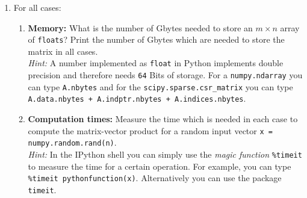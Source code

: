\begin{enumerate}
$$\begin{pmatrix}
-1 & 2 		& -1  &\ddots &  \vdots\\
0 & \ddots  		&\ddots   	 &\ddots  & 0 \\
\vdots    & \ddots  		&-1  	 &2 & -1\\
0 & \cdots 	&  0  &-1 & 2\\
\end{pmatrix} \in \mathbb{R}^{n \times n}$$
and the input vector $$x = (1,\cdots,1)^\top \in \mathbb{R}^n ~~~(\text{you can use:}~~ \verb|x = numpy.ones(n)|).$$ 
\begin{enumerate}
	\item Determine how $b:=A\cdot x \in \mathbb{R}^n$ looks like in this example in order to facilitate a test.
	\item Test whether your four routines compute the matrix--vector product correctly by checking $A\cdot x = b $.
	\item Use different values for the dimension $n$ (especially large $n\geq 10^5$ -- note that you may exceed your hardware capacities for the dense computations).
\end{enumerate}
\textit{Remark:} The matrix has ``$2$'' on the main diagonal and ``$-1$'' on the first off-diagonals.

\item For all cases:
\begin{enumerate}
	\item \textbf{Memory:} What is the number of Gbytes needed to store an $m \times n$ array of \texttt{floats}? Print the number of Gbytes which are needed to store the matrix in all cases.  \\
	\textit{Hint:} A number implemented as \texttt{float} in Python implements double precision and therefore needs \texttt{64} Bits of storage. For a \verb|numpy.ndarray| you can type \verb|A.nbytes| and for the \texttt{scipy.sparse.csr\_matrix} you can type \texttt{A.data.nbytes + A.indptr.nbytes + A.indices.nbytes}.
	\item \textbf{Computation times:} Measure the time which is needed in each case to compute the matrix-vector product for a random input vector \verb|x = numpy.random.rand(n)|. \\
	\textit{Hint:}  In the IPython shell you can simply use the \textit{magic function} \verb|%timeit| to measure the time for a certain operation. For example, you can type \verb|%timeit pythonfunction(x)|. Alternatively you can use the package \verb|timeit|.
\end{enumerate}
\end{enumerate}
